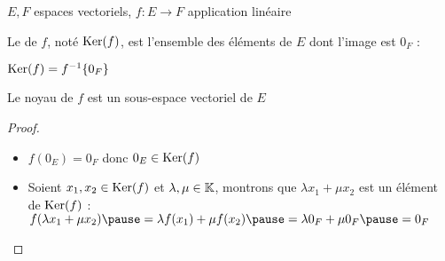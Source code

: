 \begin{frame}
\centerline{$E,F$ espaces vectoriels, $f : E \longrightarrow F$ application linéaire}
\begin{mydefinition}
Le  de $f$, noté  $\mathop{\text{Ker}}\nolimits(f)$, est l'ensemble des 
éléments de $E$ dont l'image est $0_{F}$ :
\end{mydefinition}
\pause
\centerline{$\mathop{\text{Ker}}\nolimits(f) = f^{-1} \{0_F\}$}

\pause
\begin{proposition}
Le noyau de $f$ est un sous-espace vectoriel de $E$
\end{proposition}

\pause
\begin{proof} 
\begin{itemize}
  \item $f(0_E)=0_F$ donc $0_{E} \in \mathop{\text{Ker}}\nolimits (f)$
\pause  
  \item Soient $x_1,x_2 \in \mathop{\text{Ker}}\nolimits (f)$ 
et $\lambda,\mu \in \mathbb{K}$, montrons que 
$\lambda x_1+\mu x_2$ est un élément de $\mathop{\text{Ker}}\nolimits (f)$ : \\
\pause
\hfil $f(\lambda x_1+\mu x_2)\pause=\lambda f(x_1)+\mu f(x_2)\pause= \lambda 0_{F} + \mu 0_{F}\pause=0_{F}$
\qedhere
\end{itemize}
\end{proof}
\end{frame}


